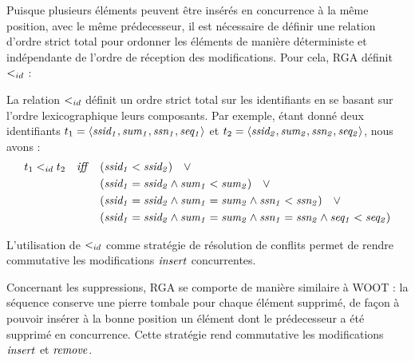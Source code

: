 Puisque plusieurs éléments peuvent être insérés en concurrence à la même position, \ie avec le même prédecesseur, il est nécessaire de définir une relation d'ordre strict total pour ordonner les éléments de manière déterministe et indépendante de l'ordre de réception des modifications.
Pour cela, \ac{RGA} définit $<_{id}$ :
\begin{definition}
  La relation $<_{id}$ définit un ordre strict total sur les identifiants en se basant sur l'ordre lexicographique leurs composants.
  Par exemple, étant donné deux identifiants $t_1 = \langle \mathit{ssid_1},\mathit{sum_1},\mathit{ssn_1},\mathit{seq_1} \rangle$ et $t_2 = \langle \mathit{ssid_2},\mathit{sum_2},\mathit{ssn_2},\mathit{seq_2} \rangle$, nous avons :
  \begin{equation*}
    \begin{split}
      t_1 <_{id} t_2 \quad \mathit{iff} \quad  & (\mathit{ssid_1} < \mathit{ssid_2}) \quad \lor \\
                                            & (\mathit{ssid_1} = \mathit{ssid_2} \land \mathit{sum_1} < \mathit{sum_2}) \quad \lor \\
                                            & (\mathit{ssid_1} = \mathit{ssid_2} \land \mathit{sum_1} = \mathit{sum_2} \land \mathit{ssn_1} < \mathit{ssn_2}) \quad \lor \\
                                            & (\mathit{ssid_1} = \mathit{ssid_2} \land \mathit{sum_1} = \mathit{sum_2} \land \mathit{ssn_1} = \mathit{ssn_2} \land \mathit{seq_1} < \mathit{seq_2}) \\
    \end{split}
  \end{equation*}
\end{definition}
L'utilisation de $<_{id}$ comme stratégie de résolution de conflits permet de rendre commutative les modifications $\mathit{insert}$ concurrentes.

Concernant les suppressions, \ac{RGA} se comporte de manière similaire à WOOT : la séquence conserve une pierre tombale pour chaque élément supprimé, de façon à pouvoir insérer à la bonne position un élément dont le prédecesseur a été supprimé en concurrence.
Cette stratégie rend commutative les modifications $\mathit{insert}$ et $\mathit{remove}$.

